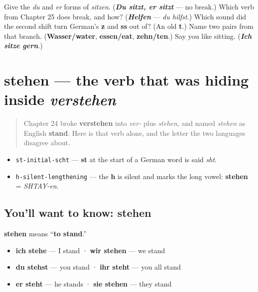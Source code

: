 \begin{tcolorbox}[breakable,colback=teal!4,colframe=teal!35!black,title={Before you move on}]
Give the \emph{du} and \emph{er} forms of \emph{sitzen}. (\emph{\textbf{Du sitzt, er sitzt}} — no break.) Which verb from Chapter 25 does break, and how? (\emph{\textbf{Helfen}} — \emph{du hilfst}.) Which sound did the second shift turn German's \textbf{z} and \textbf{ss} out of? (An old \textbf{t}.) Name two pairs from that branch. (\textbf{Wasser/water}, \textbf{essen/eat}, \textbf{zehn/ten}.) Say you like sitting. (\emph{\textbf{Ich sitze gern}}.)
\end{tcolorbox}
\section[stehen]{stehen — the verb that was hiding inside \emph{verstehen}}

\label{lesson:GE-C26-stehen}



\begin{quote}
Chapter 24 broke \textbf{verstehen} into \emph{ver-} plus \emph{stehen}, and named \emph{stehen} as English \textbf{stand}. Here is that verb alone, and the letter the two languages disagree about.
\end{quote}

\begin{sounds}
\begin{itemize}
\raggedright
  \item \texttt{st-initial-scht} — \textbf{st} at the start of a German word is said \emph{sht}.
  \item \texttt{h-silent-lengthening} — the \textbf{h} is silent and marks the long vowel: \textbf{stehen} = \emph{SHTAY-en}.
\end{itemize}
\end{sounds}

\subsection*{You'll want to know: stehen}
\textbf{stehen} means \textquotedblleft{}\textbf{to stand}.\textquotedblright{}

\begin{itemize}
\raggedright
  \item \textbf{ich stehe} — I stand · \textbf{wir stehen} — we stand
  \item \textbf{du stehst} — you stand · \textbf{ihr steht} — you all stand
  \item \textbf{er steht} — he stands · \textbf{sie stehen} — they stand
\end{itemize}

